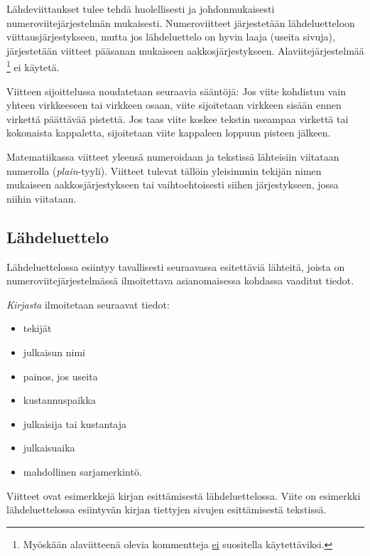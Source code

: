 Lähdeviittaukset tulee tehdä huolellisesti ja johdonmukaisesti
numeroviitejärjestelmän mukaisesti. Numeroviitteet järjestetään
lähdeluetteloon viittausjärjestykseen, mutta jos lähdeluettelo
on hyvin laaja (useita sivuja), järjestetään viitteet pääsanan 
mukaiseen aakkosjärjestykseen. Alaviitejärjestelmää
\footnote{Myöskään alaviitteenä olevia kommentteja \underline{ei} suositella
käytettäviksi.} ei käytetä. 

Viitteen sijoittelussa noudatetaan seuraavia sääntöjä:
Jos viite kohdistuu vain yhteen virkkeeseen tai virkkeen 
osaan, viite \citep{Kauranen} sijoitetaan virkkeen sisään ennen virkettä
päättävää pistettä. Jos taas viite koskee tekstin useampaa
virkettä tai kokonaista kappaletta, sijoitetaan viite kappaleen loppuun 
pisteen jälkeen. \citep{Kauranen} 

Matematiikassa viitteet yleensä numeroidaan ja tekstissä lähteisiin viitataan numerolla (\emph{plain}-tyyli). Viitteet tulevat tällöin yleisimmin tekijän nimen mukaiseen aakkosjärjestykseen tai vaihtoehtoisesti siihen järjestykseen, jossa niihin viitataan.

\subsection{Lähdeluettelo} 

Lähdeluettelossa esiintyy tavallisesti seuraavassa esitettäviä
lähteitä, joista on numeroviitejärjestelmässä ilmoitettava
asianomaisessa kohdassa vaaditut tiedot.

\textit{Kirjasta} ilmoitetaan seuraavat tiedot:

\begin{itemize}
\item[--]tekijät 
\item[--]julkaisun nimi
\item[--]painos, jos useita
\item[--]kustannuspaikka
\item[--]julkaisija tai kustantaja
\item[--]julkaisuaika
\item[--]mahdollinen sarjamerkintö. 
\end{itemize}

Viitteet \citep{Kauranen,Koblitz} ovat esimerkkejä kirjan
esittämisestä lähdeluettelossa. Viite \citep[s.\ 83--124]{Koblitz} on
esimerkki lähdeluettelossa esiintyvän kirjan tiettyjen sivujen
esittämisestä tekstissä.

